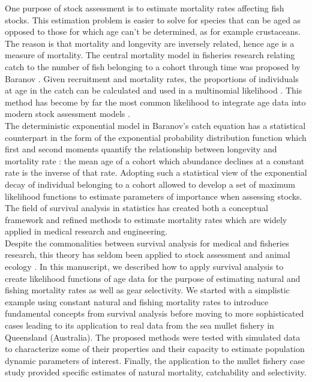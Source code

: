 One purpose of stock assessment is to estimate mortality rates affecting fish stocks. This estimation problem is easier to solve for species that can be aged as opposed to those for which age can't be determined, as for example crustaceans. The reason is that mortality and longevity are inversely related, hence age is a measure of mortality. The central mortality model in fisheries research relating catch to the number of fish belonging to a cohort through time was proposed by Baranov \citep{quin99b}. Given recruitment and mortality rates, the proportions of individuals at age in the catch can be calculated and used in a multinomial likelihood  \citep{Four82a}. This method has become by far the most common likelihood to integrate age data into modern stock assessment models \citep{Francis201470, Maunder201361}.\\

The deterministic exponential model in Baranov's catch equation has a statistical counterpart in the form of the exponential probability distribution function which first and second moments quantify the relationship between longevity and mortality rate \citep{cow98b}: the mean age of a cohort which abundance declines at a constant rate is the inverse of that rate. Adopting such a statistical view of the exponential decay of individual belonging to a cohort allowed to develop a set of maximum likelihood functions to estimate parameters of importance when assessing stocks. The field of survival analysis in statistics has created both a conceptual framework and refined methods to estimate mortality rates \citep{kleinbaum2005survival,cox84b} which are widely applied in medical research and engineering. \\ 

Despite the commonalities between survival analysis for medical and fisheries research, this theory has seldom been applied to stock assessment and animal ecology \citep{scimar42, Pollock1989}. In this manuscript, we described how to apply survival analysis to create likelihood functions of age data for the purpose of estimating natural and fishing mortality rates as well as gear selectivity. We started with a simplistic example using constant natural and fishing mortality rates to introduce fundamental concepts from survival analysis before moving to more sophisticated cases leading to its application to real data from the sea mullet fishery in Queensland (Australia). The proposed methods were tested with simulated data to characterize some of their properties and their capacity to estimate population dynamic parameters of interest. Finally, the application to the mullet fishery case study provided specific estimates of natural mortality, catchability and selectivity. \\
